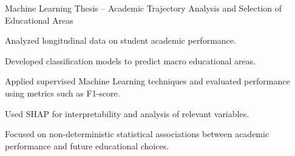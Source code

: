 
\begin{cventries}

\cventry
  {Machine Learning}
  {Thesis – Academic Trajectory Analysis and Selection of Educational Areas}
  {}
  {}
  {
    \begin{cvitems}
      \item {Analyzed longitudinal data on student academic performance.}
      \item {Developed classification models to predict macro educational areas.}
      \item {Applied supervised Machine Learning techniques and evaluated performance using metrics such as F1-score.}
      \item {Used SHAP for interpretability and analysis of relevant variables.}
      \item {Focused on non-deterministic statistical associations between academic performance and future educational choices.}
    \end{cvitems}
    \vspace{5mm}
  }


\end{cventries}
